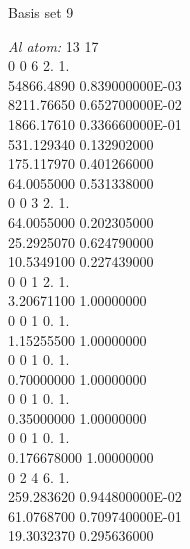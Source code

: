\documentclass[11pt,DIV=13,BCOR=5mm,a4paper,headinclude]{scrbook}
\begin{document}
Basis set 9\\
\begin{spacing}{0.5}
{\tiny \textit{Al atom: }
13 17\\
0 0 6 2. 1.\\

54866.4890         0.839000000E-03\\

8211.76650         0.652700000E-02\\

1866.17610         0.336660000E-01\\

531.129340         0.132902000\\

175.117970         0.401266000\\

64.0055000         0.531338000\\
0 0 3 2. 1.\\

64.0055000         0.202305000\\

25.2925070         0.624790000\\

10.5349100         0.227439000\\
0 0 1 2. 1.\\

3.20671100          1.00000000\\
0 0 1 0. 1.\\

1.15255500          1.00000000\\
0 0 1 0. 1.\\

0.70000000          1.00000000\\
0 0 1 0. 1.\\

0.35000000          1.00000000\\
0 0 1 0. 1.\\

0.176678000          1.00000000\\
0 2 4 6. 1.\\

259.283620         0.944800000E-02\\

61.0768700         0.709740000E-01\\

19.3032370         0.295636000\\

}
\end{spacing}
\end{document}
